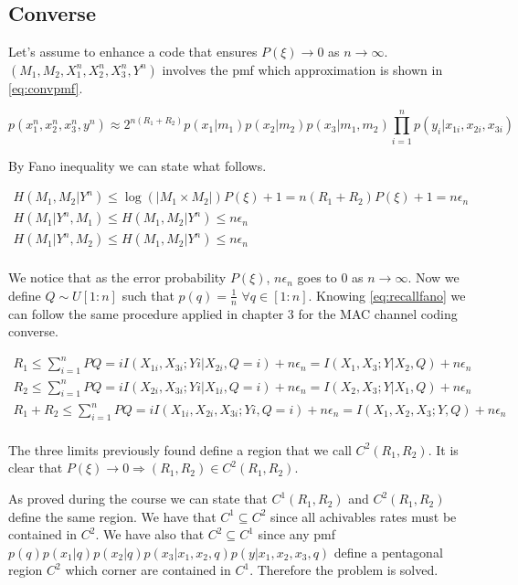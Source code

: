 \subsection{Converse}

Let's assume to enhance a code that ensures $P(\xi) \rightarrow 0$ as $n \rightarrow \infty$. $(M_1,M_2,X_1^n,X_2^n,X_3^n,Y^n)$ involves the pmf which approximation is shown in \eqref{eq:convpmf}.

\begin{equation}
	p(x_1^n,x_2^n,x_3^n,y^n)\approx2^{n(R_1+R_2)}p(x_1|m_1)p(x_2|m_2)p(x_3|m_1,m_2)\prod_{i=1}^n p(y_i|x_{1i},x_{2i},x_{3i})
	\label{eq:convpmf}
\end{equation}

By Fano inequality we can state what follows.

\begin{equation}
	\begin{gathered}
		H(M_1,M_2|Y^n) \leq \log(|M_1\times M_2|)P(\xi)+1 = n(R_1+R_2)P(\xi)+1 = n\epsilon_n\\
		H(M_1|Y^n,M_1) \leq H(M_1,M_2|Y^n) \leq n\epsilon_n \\
		H(M_1|Y^n,M_2) \leq H(M_1,M_2|Y^n) \leq n\epsilon_n\\
	\end{gathered}
	\label{eq:recallfano}
\end{equation}

We notice that as the error probability $P(\xi)$, $n\epsilon_n$ goes to $0$ as $n \rightarrow \infty$. Now we define $Q \sim U[1:n]$ such that $p(q)=\frac{1}{n}$ $\forall q \in [1:n]$. Knowing \eqref{eq:recallfano} we can follow the same procedure applied in chapter 3 for the MAC channel coding converse.

\begin{equation}
	\begin{gathered}
		R_1 \leq \sum_{i=1}^n P{Q=i} I(X_{1i},X_{3i};Yi|X_{2i},Q=i) + n\epsilon_n = I(X_{1},X_{3};Y|X_{2},Q)+n\epsilon_n\\
		R_2 \leq \sum_{i=1}^n P{Q=i} I(X_{2i},X_{3i};Yi|X_{1i}, Q=i) + n\epsilon_n = I(X_{2},X_{3};Y|X_{1},Q)+n\epsilon_n\\
		R_1 + R_2 \leq \sum_{i=1}^n P{Q=i}I(X_{1i},X_{2i},X_{3i};Yi, Q=i) + n\epsilon_n = I(X_{1},X_{2},X_{3};Y,Q)+n\epsilon_n \\
	\end{gathered}
\end{equation}

The three limits previously found define a region that we call $C^2(R_1,R_2)$. It is clear that $ P(\xi) \rightarrow 0 \Rightarrow (R_1,R_2) \in C^2(R_1, R_2)$.

As proved during the course we can state that $C^1(R_1,R_2)$ and $C^2(R_1,R_2)$ define the same region. We have that $C^1 \subseteq C^2$ since all achivables rates must be contained in $C^2$. We have also that $C^2 \subseteq C^1$ since any pmf $p(q)p(x_1|q)p(x_2|q)p(x_3|x_1,x_2,q)p(y|x_1,x_2,x_3,q)$ define a pentagonal region $C^2$ which corner are contained in $C^1$. Therefore the problem is solved.
